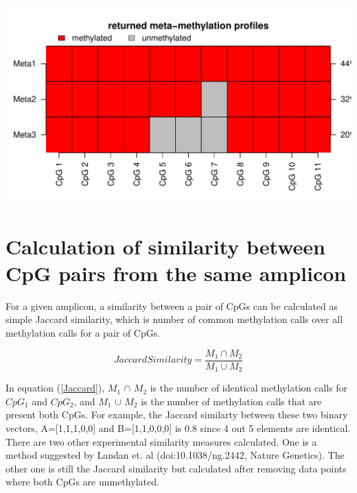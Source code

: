 \documentclass{article}\usepackage[]{graphicx}\usepackage[]{color}
\newenvironment{knitrout}{}{} %
\begin{document}
\begin{knitrout}
\color{fgcolor}

{\centering \includegraphics[width=.9\linewidth]{figure/manual-metaReveal} 

}



\end{knitrout}



\section{Calculation of similarity between CpG pairs from the same amplicon}
For a given amplicon, a similarity between a pair of CpGs can be calculated as
simple Jaccard similarity, which is number of common methylation calls over all
methylation calls for a pair of CpGs.

\begin{equation}\label{Jaccard}
 Jaccard Similarity =\frac{M_1 \cap M_2}{M_1 \cup M_2}
\end{equation}

In equation (\ref{Jaccard}), $M_1$ $\cap$ $M_2$ is the number of identical 
methylation calls for $CpG_1$ and $CpG_2$, and $M_1$ $\cup$ $M_2$ is the number
of methylation calls that are present both CpGs. For example, the Jaccard similarty between
these two binary vectors, A=[1,1,1,0,0] and B=[1,1,0,0,0] is 0.8 since 4 out 5 elements are
identical.
\\ 

There are two other experimental similarity measures calculated. One is a method suggested by Landan et. al  (doi:10.1038/ng.2442, Nature Genetics).
The other one is still the Jaccard similarity but calculated after removing data 
points where both CpGs are unmethylated. 
\end{document}
